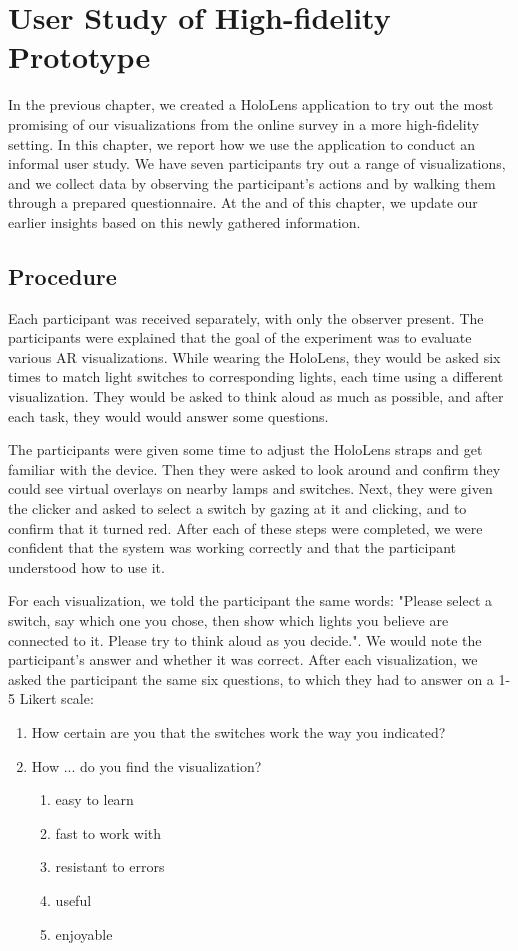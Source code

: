 \chapter{User Study of High-fidelity Prototype} \label{chap:user}
In the previous chapter, we created a HoloLens application to try out the most promising of our visualizations from the online survey in a more high-fidelity setting. In this chapter, we report how we use the application to conduct an informal user study. We have seven participants try out a range of visualizations, and we collect data by observing the participant's actions and by walking them through a prepared questionnaire. At the and of this chapter, we update our earlier insights based on this newly gathered information.

\section{Procedure} \label{sec:user:survey:procedure}
Each participant was received separately, with only the observer present. The participants were explained that the goal of the experiment was to evaluate various AR visualizations. While wearing the HoloLens, they would be asked six times to match light switches to corresponding lights, each time using a different visualization. They would be asked to think aloud as much as possible, and after each task, they would would answer some questions.

The participants were given some time to adjust the HoloLens straps and get familiar with the device. Then they were asked to look around and confirm they could see virtual overlays on nearby lamps and switches. Next, they were given the clicker and asked to select a switch by gazing at it and clicking, and to confirm that it turned red. After each of these steps were completed, we were confident that the system was working correctly and that the participant understood how to use it.

For each visualization, we told the participant the same words: "Please select a switch, say which one you chose, then show which lights you believe are connected to it. Please try to think aloud as you decide.". We would note the participant's answer and whether it was correct. After each visualization, we asked the participant the same six questions, to which they had to answer on a 1-5 Likert scale:
\begin{enumerate}
  \item How certain are you that the switches work the way you indicated?
  \item How ... do you find the visualization?
  \begin{enumerate}
    \item easy to learn
    \item fast to work with
    \item resistant to errors
    \item useful
    \item enjoyable
  \end{enumerate}
\end{enumerate}

